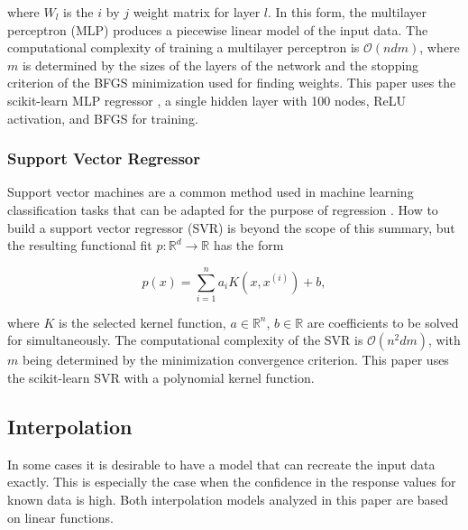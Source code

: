 \documentclass{scspaperproc}
\theoremstyle{scsthe}
\begin{document}
where $W_l$ is the $i$ by $j$ weight matrix for layer $l$. In this
form, the multilayer perceptron (MLP) produces a piecewise linear
model of the input data. The computational complexity of training a
multilayer perceptron is $\mathcal{O}(n d m)$, where $m$ is
determined by the sizes of the layers of the network and the stopping
criterion of the BFGS minimization used for finding weights. This
paper uses the scikit-learn MLP regressor , a
single hidden layer with 100 nodes, ReLU activation, and BFGS for
training.

\subsubsection{Support Vector Regressor}
\vspace{-10pt}
Support vector machines are a common method used in machine learning
classification tasks that can be adapted for the purpose of regression
. How to build a support vector regressor
(SVR) is beyond the scope of this summary, but the resulting
functional fit $p : \mathbb{R}^d \rightarrow \mathbb{R}$ has the form

$$ p(x)  = \sum_{i=1}^{n}a_i K(x,x^{(i)}) + b ,$$



where $K$ is the selected kernel function, $a \in \mathbb{R}^n$, $b
\in \mathbb{R}$ are coefficients to be solved for simultaneously. The
computational complexity of the SVR is $\mathcal{O}(n^2dm)$, with $m$
being determined by the minimization convergence criterion. This paper
uses the scikit-learn SVR  with a polynomial
kernel function.

\vspace{-10pt}
\subsection{Interpolation}
\vspace{-10pt}
In some cases it is desirable to have a model that can recreate the
input data exactly. This is especially the case when the confidence in
the response values for known data is high. Both interpolation models
analyzed in this paper are based on linear functions.
\end{document}
